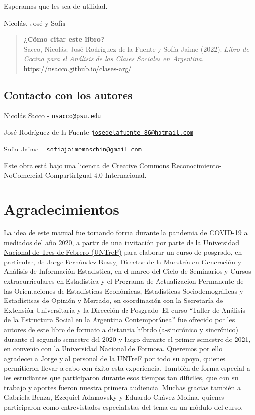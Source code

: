 \documentclass[
]{article}
\begin{document}
Esperamos que les sea de utilidad.

Nicolás, José y Sofía

\begin{quote}
\textbf{¿Cómo citar este libro?}\\
Sacco, Nicolás; José Rodríguez de la Fuente y Sofía Jaime (2022). \emph{Libro de Cocina para el Análisis de las Clases Sociales en Argentina}. \url{https://nsacco.github.io/clases-arg/}
\end{quote}

\hypertarget{contacto-con-los-autores}{%
\subsection*{Contacto con los autores}\label{contacto-con-los-autores}}

Nicolás Sacco - \href{mailto:nsacco@psu.edu}{\nolinkurl{nsacco@psu.edu}}

José Rodríguez de la Fuente \href{mailto:josedelafuente_86@hotmail.com}{\nolinkurl{josedelafuente\_86@hotmail.com}}

Sofia Jaime -- \href{mailto:sofiajaimemoschin@gmail.com}{\nolinkurl{sofiajaimemoschin@gmail.com}}

Este obra está bajo una licencia de Creative Commons Reconocimiento-NoComercial-CompartirIgual 4.0 Internacional.

\hypertarget{agradecimientos}{%
\section*{Agradecimientos}\label{agradecimientos}}

La idea de este manual fue tomando forma durante la pandemia de COVID-19 a mediados del año 2020, a partir de una invitación por parte de la \href{https://untref.edu.ar}{Universidad Nacional de Tres de Febrero (UNTreF)} para elaborar un curso de posgrado, en particular, de Jorge Fernández Bussy, Director de la Maestría en Generación y Análisis de Información Estadística, en el marco del Ciclo de Seminarios y Cursos extracurriculares en Estadística y el Programa de Actualización Permanente de las Orientaciones de Estadísticas Económicas, Estadísticas Sociodemográficas y Estadísticas de Opinión y Mercado, en coordinación con la Secretaría de Extensión Universitaria y la Dirección de Posgrado. El curso ``Taller de Análisis de la Estructura Social en la Argentina Contemporánea'' fue ofrecido por les autores de este libro de formato a distancia híbrdo (a-sincrónico y sincrónico) durante el segundo semestre del 2020 y luego durante el primer semestre de 2021, en convenio con la Universidad Nacional de Formosa. Queremos por ello agradecer a Jorge y al personal de la UNTreF por todo su apoyo, quienes permitieron llevar a cabo con éxito esta experiencia. También de forma especial a les estudiantes que participaron durante esos tiempos tan difíciles, que con su trabajo y aportes fueron nuestra primera audiencia. Muchas gracias también a Gabriela Benza, Ezequiel Adamovsky y Eduardo Chávez Molina, quienes participaron como entrevistados especialistas del tema en un módulo del curso.
\end{document}
